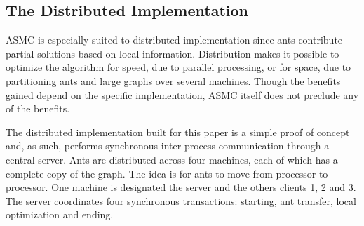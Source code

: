 \documentclass[11pt]{article}
\begin{document}

\subsection{The Distributed Implementation}\label{dist_app} 

\label{distributed}

ASMC is especially suited to distributed implementation since ants contribute
partial solutions based on local information.  Distribution makes it possible
to optimize the algorithm for speed, due to parallel processing, or for space,
due to partitioning ants and large graphs over several machines.  Though the
benefits gained depend on the specific implementation, ASMC itself does not
preclude any of the benefits.






The distributed implementation built for this paper is a simple proof of
concept and, as such, performs synchronous inter-process communication through a
central server.  Ants are distributed across four machines, each of which has
a complete copy of the graph.  The idea is for ants to move from processor to
processor.  One machine is designated the server and the others clients 1, 2
and 3.  The server coordinates four synchronous transactions: starting, ant
transfer, local optimization and ending.
\end{document}
